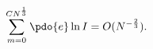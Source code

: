 \begin{equation}
\label{Eq_A27}
\sum^{CN^{\frac{1}{3}}}_{m=0} \pdo{e} \ln I = O(N^{-\frac{2}{3}}).
\end{equation}


